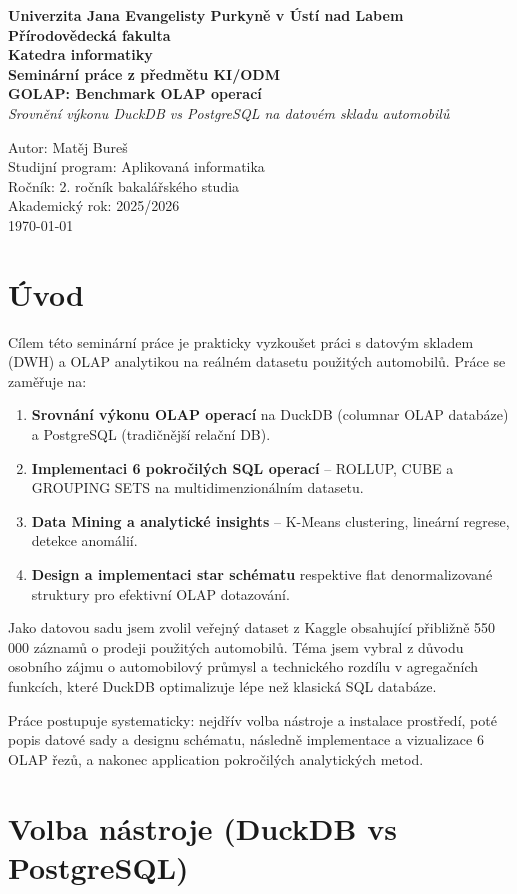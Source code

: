 \documentclass[12pt,a4paper]{article}
\newcommand{\ujephead}{%
    \begin{center}
        \textbf{Univerzita Jana Evangelisty Purkyně v Ústí nad Labem}\\
        \textbf{Přírodovědecká fakulta}\\
        \textbf{Katedra informatiky}\\[2cm]
        \Large \textbf{Seminární práce z předmětu KI/ODM}\\[0.5cm]
        \LARGE \textbf{GOLAP: Benchmark OLAP operací}\\
        \large \textit{Srovnění výkonu DuckDB vs PostgreSQL na datovém skladu automobilů}\\[2cm]
    \end{center}
}
\newcommand{\modsinfo}{%
    \begin{flushright}
        Autor: Matěj Bureš\\
        Studijní program: Aplikovaná informatika\\
        Ročník: 2. ročník bakalářského studia\\
        Akademický rok: 2025/2026\\
        \today
    \end{flushright}
}
\begin{document}
\begin{titlepage}
    \ujephead
    \vfill
    \modsinfo
    \newpage
\end{titlepage}

\tableofcontents
\newpage

\section{Úvod}

Cílem této seminární práce je prakticky vyzkoušet práci s datovým skladem (DWH) a OLAP 
analytikou na reálném datasetu použitých automobilů. Práce se zaměřuje na:

\begin{enumerate}
    \item \textbf{Srovnání výkonu OLAP operací} na DuckDB (columnar OLAP databáze)
          a PostgreSQL (tradičnější relační DB).
    \item \textbf{Implementaci 6 pokročilých SQL operací} – ROLLUP, CUBE a GROUPING SETS
          na multidimenzionálním datasetu.
    \item \textbf{Data Mining a analytické insights} – K-Means clustering, lineární regrese,
          detekce anomálií.
    \item \textbf{Design a implementaci star schématu} respektive flat denormalizované struktury
          pro efektivní OLAP dotazování.
\end{enumerate}

Jako datovou sadu jsem zvolil veřejný dataset z Kaggle obsahující přibližně 550 000 záznamů
o prodeji použitých automobilů. Téma jsem vybral z důvodu osobního zájmu o automobilový průmysl
a technického rozdílu v agregačních funkcích, které DuckDB optimalizuje lépe než klasická SQL databáze.

Práce postupuje systematicky: nejdřív volba nástroje a instalace prostředí, poté popis datové sady
a designu schématu, následně implementace a vizualizace 6 OLAP řezů, a nakonec application pokročilých
analytických metod.

\newpage

\section{Volba nástroje (DuckDB vs PostgreSQL)}
\end{document}
